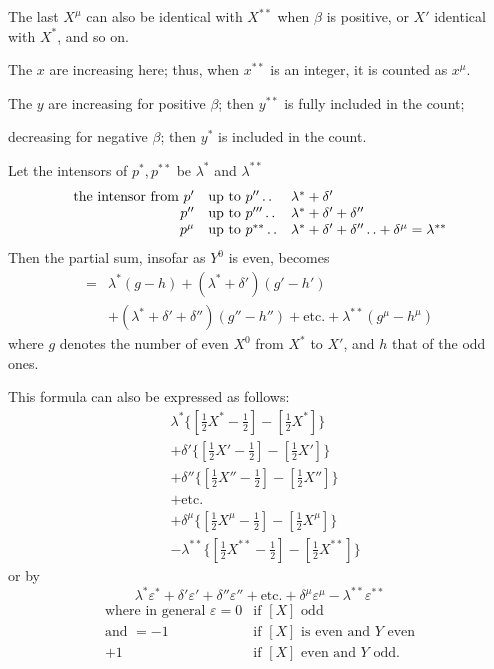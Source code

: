 The last $X^\mu$ can also be identical with $X^{**}$ when $\beta$ is positive, or $X'$ identical with $X^*$, and so on.

The $x$ are increasing here; thus, when $x^{**}$ is an integer, it is counted as $x^\mu$.

The $y$ are increasing for positive $\beta$; then $y^{**}$ is fully included in the count;
\begin{center}decreasing for negative $\beta$; then $y^*$ is included in the count.\end{center}

Let the intensors of $p^*,p^{**}$ be $\lambda^*$ and $\lambda^{**}$
\[
\begin{array}{rll}
\text{the intensor from }p'&\text{up to }p''\mathinner{.\,.}&\lambda^*+\delta'\\
p''&\text{up to }p'''\mathinner{.\,.}&\lambda^*+\delta'+\delta''\\
p^\mu&\text{up to }p^{**}\mathinner{.\,.}&\lambda^*+\delta'+\delta''\mathinner{.\,.}+\delta^\mu=\lambda^{**}
\end{array}
\]
Then the partial sum, insofar as $Y^0$ is even, becomes
\[
\begin{aligned}
={}&\lambda^*(g-h)+(\lambda^*+\delta')(g'-h')\\
&+(\lambda^*+\delta'+\delta'')(g''-h'')+\text{etc.}+\lambda^{**}(g^\mu-h^\mu)
\end{aligned}
\]
where $g$ denotes the number of even $X^0$ from $X^*$ to $X'$, and $h$ that of the odd ones.

\clearpage{}
This formula can also be expressed as follows:
\[
\begin{aligned}
&\lambda^*\{[\tfrac12X^*-\tfrac12]-[\tfrac12X^*]\}\\
&+\delta'\{[\tfrac12X'-\tfrac12]-[\tfrac12X']\}\\
&+\delta''\{[\tfrac12X''-\tfrac12]-[\tfrac12X'']\}\\
&+\text{etc.}\\
&+\delta^\mu\{[\tfrac12X^\mu-\tfrac12]-[\tfrac12X^\mu]\}\\
&-\lambda^{**}\{[\tfrac12X^{**}-\tfrac12]-[\tfrac12X^{**}]\}
\end{aligned}
\]
or by
\[
\lambda^*\varepsilon^*+\delta'\varepsilon'+\delta''\varepsilon''+\text{etc.}+\delta^\mu\varepsilon^\mu-\lambda^{**}\varepsilon^{**}
\]
\[
\begin{array}{rll}
\text{where in general }\varepsilon=0&\text{if }[X]\text{ odd}\\
\text{and }=-1&\text{if }[X]\text{ is even and }Y\text{ even}\\
+1&\text{if }[X]\text{ even and }Y\text{ odd.}
\end{array}
\]

